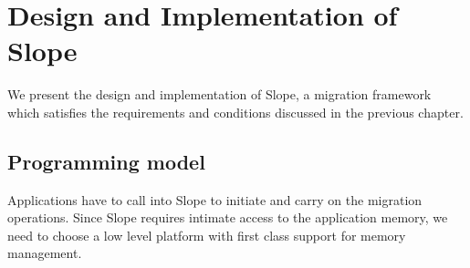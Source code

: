 \chapter{Design and Implementation of Slope}
\label{chap:design}

% 
% 

We present the design and implementation of Slope, a migration framework which
satisfies the requirements and conditions discussed in the previous chapter.

\section{Programming model}
\label{sec:platform}


Applications have to call into Slope to initiate and carry on the
migration operations. Since Slope requires intimate access to the application
memory, we need to choose a low level platform with first class support for
memory management.

